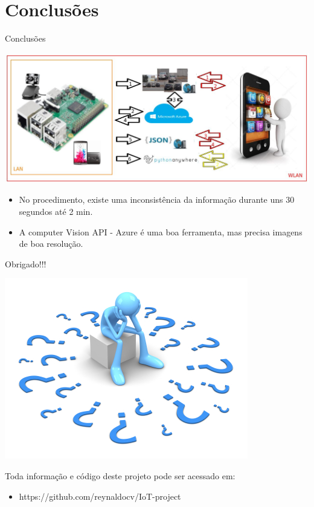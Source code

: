 \documentclass{beamer}
\begin{document}
\section{Conclusões}


\begin{frame}{Conclusões}
\begin{center}
\includegraphics[width=1\textwidth]{img/estrutura.jpeg}   
\end{center}
\begin{itemize}\small
 \item No procedimento, existe uma inconsistência da informação durante uns 30 segundos até 2 min.  
 \item A computer Vision API - Azure é uma boa ferramenta, mas precisa imagens de boa resolução.
 
\end{itemize}

\end{frame}


\begin{frame}{Obrigado!!!}
\begin{center}
\includegraphics[width=.4\textwidth]{img/duvidas.jpg}   
\end{center}
Toda informação e código deste projeto pode ser acessado em:  
\begin{itemize}\small
 \item https://github.com/reynaldocv/IoT-project
\end{itemize}

\end{frame}
\end{document}

